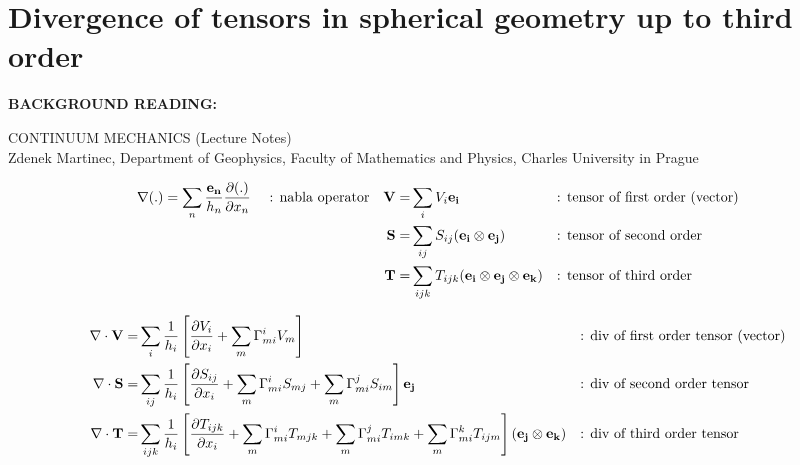 \documentclass[10pt,paper=a4]{report}
\begin{document}
\section{Divergence of tensors in spherical geometry up to third order}

\noindent
{\bf{BACKGROUND READING:}} \\

\vspace{0.3cm}

\noindent
CONTINUUM MECHANICS (Lecture Notes) \\
Zdenek Martinec, Department of Geophysics, Faculty of Mathematics and Physics, Charles University in Prague 




\fontsize{9pt}{20pt}

\begin{align}
\nabla (.) = \sum_n \frac{{\bf{e_n}}}{h_n}\frac{\partial (.)}{\partial x_n} \ \ \ \ \mbox{: nabla operator} & & {\bf{V}} = &  \sum_i V_i {\bf{{e_i}}} & & \mbox{: tensor of first order (vector)}\\
& & {\bf{S}} = &  \sum_{ij} S_{ij} ({\bf{e_i}} \otimes {\bf{e_j}}) & & {\mbox{: tensor of second order}}\\
& & {\bf{T}} = &  \sum_{ijk} T_{ijk} ({\bf{e_i}} \otimes {\bf{e_j}} \otimes {\bf{e_k}}) & & \mbox{: tensor of third order}
\end{align}

\begin{align}
\nabla \cdot {\bf{V}} = & \sum_i \frac{1}{h_i} \left[ \frac{\partial V_i}{\partial x_i} + \sum_m \Gamma_{mi}^i V_m \right] & & \mbox{: div of first order tensor (vector)} \\
\nabla \cdot {\bf{S}} = & \sum_{ij} \frac{1}{h_i} \left[ \frac{\partial S_{ij}}{\partial x_i} + \sum_m \Gamma_{mi}^i S_{mj} + \sum_m \Gamma_{mi}^j S_{im} \right] {\bf{e_j}} & & \mbox{: div of second order tensor} \\
\nabla \cdot {\bf{T}} = & \sum_{ijk} \frac{1}{h_i} \left[ \frac{\partial T_{ijk}}{\partial x_i} + \sum_m \Gamma_{mi}^i T_{mjk} + \sum_m \Gamma_{mi}^j T_{imk} + \sum_m \Gamma_{mi}^k T_{ijm} \right]  ({\bf{e_j}} \otimes {\bf{e_k}}) & & \mbox{: div of third order tensor}
\end{align}
\end{document}

